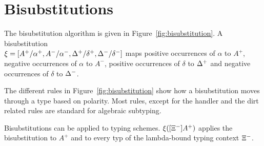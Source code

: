 \section{Bisubstitutions}
The bisubstitution algorithm is given in Figure~\ref{fig:bisubstitution}. A bisubstitution\\ $\xi = [A^+ / \alpha^+, A^- / \alpha^-, \Delta^+/ \delta^+, \Delta^- / \delta^-]$ maps positive occurrences of $\alpha$ to $A^+$, negative occurrences of $\alpha$ to $A^-$, positive occurrences of $\delta$ to $\Delta^+$ and negative occurrences of $\delta$ to $\Delta^-$. 

The different rules in Figure~\ref{fig:bisubstitution} show how a bisubstitution moves through a type based on polarity. Most rules, except for the handler and the dirt related rules are standard for algebraic subtyping.

Bisubstitutions can be applied to typing schemes. $\xi([\Xi^-]A^+)$ applies the bisubstitution to $A^+$ and to every typ of the lambda-bound typing context $\Xi^-$.  


